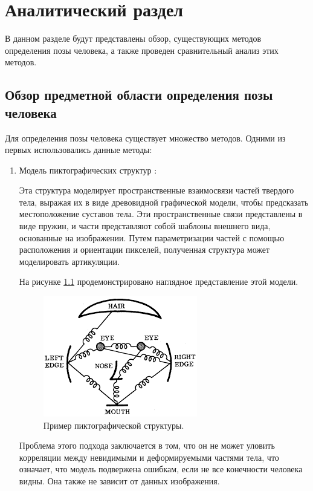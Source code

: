 
\chapter{Аналитический раздел}

В данном разделе будут представлены обзор, существующих методов определения позы человека, а также проведен сравнительный анализ этих методов.

\section{Обзор предметной области определения позы человека}

Для определения позы человека существует множество методов. Одними из первых использовались данные методы: 
\begin{enumerate}[label=\arabic*)]
 	\item Модель пиктографических структур \cite{polygraphic}:
 	
 		Эта структура моделирует пространственные взаимосвязи частей твердого тела, выражая их в виде древовидной графической модели, чтобы предсказать местоположение суставов тела. 
 		Эти пространственные связи представлены в виде пружин, и части представляют собой шаблоны внешнего вида, основанные на изображении. 
 		Путем параметризации частей с помощью расположения и ориентации пикселей, полученная структура может моделировать артикуляции. 
 		
 		На рисунке \ref{img:polygraphic} продемонстрировано наглядное представление этой модели.
 		\begin{figure}[ht!]
 			\centering
 			\includegraphics[width=0.4\linewidth]{assets/poly.png}
 			\caption{Пример пиктографической структуры.}
 			\label{img:polygraphic}
 		\end{figure}
 		
 		
 		Проблема этого подхода заключается в том, что он не может уловить корреляции между невидимыми и деформируемыми частями тела, что означает, что модель подвержена ошибкам, если не все конечности человека видны. 
 		Она также не зависит от данных изображения.
 		


\end{enumerate}
